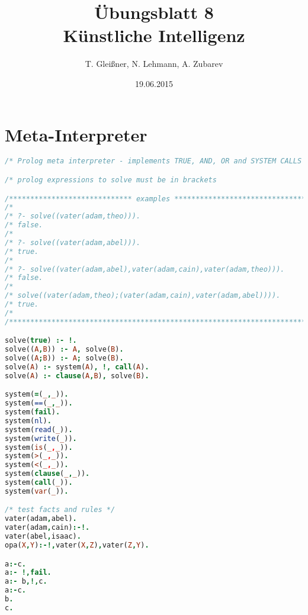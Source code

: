 \documentclass[12pt]{article}
\title{\"Ubungsblatt 8\\ \glqq K\"unstliche Intelligenz\grqq}
\author{T. Glei\ss ner, N. Lehmann, A. Zubarev}
\date{19.06.2015}
\begin{document}
\maketitle
\tableofcontents
\newpage

\section{Meta-Interpreter}

\begin{lstlisting}[language=Prolog]
/* Prolog meta interpreter - implements TRUE, AND, OR and SYSTEM CALLS  */

/* prolog expressions to solve must be in brackets                      */

/***************************** examples *********************************/
/*                                                                      */
/* ?- solve((vater(adam,theo))).                                        */
/* false.                                                               */
/*                                                                      */
/* ?- solve((vater(adam,abel))).                                        */
/* true.                                                                */
/*                                                                      */
/* ?- solve((vater(adam,abel),vater(adam,cain),vater(adam,theo))).      */
/* false.                                                               */
/*                                                                      */
/* solve((vater(adam,theo);(vater(adam,cain),vater(adam,abel)))).       */
/* true.                                                                */
/*                                                                      */
/************************************************************************/

solve(true) :- !.
solve((A,B)) :- A, solve(B).
solve((A;B)) :- A; solve(B).
solve(A) :- system(A), !, call(A).
solve(A) :- clause(A,B), solve(B).

system(=(_,_)).
system(==(_,_)).
system(fail).
system(nl).
system(read(_)).
system(write(_)).
system(is(_,_)).
system(>(_,_)).
system(<(_,_)).
system(clause(_,_)).
system(call(_)).
system(var(_)).

/* test facts and rules */
vater(adam,abel).
vater(adam,cain):-!.
vater(abel,isaac).
opa(X,Y):-!,vater(X,Z),vater(Z,Y).

a:-c.
a:- !,fail.
a:- b,!,c.
a:-c.
b.
c.
\end{lstlisting}
\end{document}
